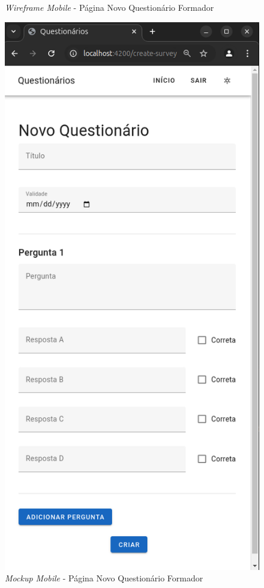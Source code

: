 \documentclass[12pt,a4paper,final]{article}
\begin{document}
\begin{figure}[H]
        \caption{\textit{Wireframe Mobile} - Página Novo Questionário Formador}
        \label{fig:wm-pnqf}
    \end{figure}

    \begin{figure}[H]
        \centering
        \includegraphics[width=\textwidth,height=0.9\textheight,keepaspectratio]{mockups/questionarios.wireframes-formador-novo-questionario-mobile}
        \caption{\textit{Mockup Mobile} - Página Novo Questionário Formador}
        \label{fig:mm-pnqf}
    \end{figure}
\end{document}
